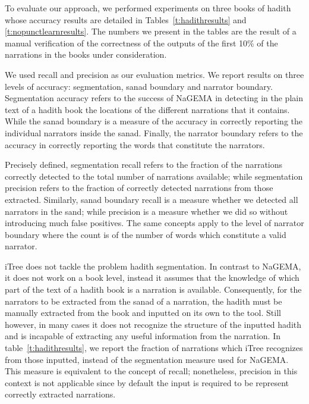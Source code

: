 \documentclass[11pt]{article}
\begin{document}
To evaluate our approach, we performed experiments on three books of 
hadith~\cite{IbnHanbal,AlTousi,AlKulayni} whose accuracy results are detailed in 
Tables~\ref{t:hadithresults} and \ref{t:nopunctlearnresults}. 
The numbers we present in the tables are the result of a manual verification of the correctness of the outputs of the first
10\% of the narrations in the books under consideration.

We used recall and precision as our evaluation metrics.
We report results on three levels of accuracy: segmentation, sanad boundary and
narrator boundary. Segmentation accuracy refers to the success of NaGEMA in
detecting in the plain text of a hadith book the locations of the different
narrations that it contains. While the sanad boundary is a measure of the accuracy
in correctly reporting the individual narrators inside the sanad. Finally, the narrator boundary refers
to the accuracy in correctly reporting the words that constitute the narrators.

Precisely defined, segmentation recall refers to the fraction of the narrations correctly detected to the
total number of narrations available; while segmentation precision refers to the fraction of correctly detected narrations
from those extracted. Similarly, sanad boundary recall is a measure whether we detected all narrators
in the sand; while precision is a measure whether we did so without introducing much false positives. 
The same concepts apply to the level of narrator boundary where the count is of the number of words which constitute a valid narrator.

iTree does not tackle the problem hadith segmentation. In contrast to NaGEMA, it does not work on a book level, 
instead it assumes that the knowledge of which part of the text of a hadith book is a narration is available.
Consequently, for the narrators to be extracted from the sanad of a narration, the hadith must be manually extracted
from the book and inputted on its own to the tool. Still however, in many cases it does not recognize the structure of
the inputted hadith and is incapable of extracting any useful information from the narration. 
In table~\ref{t:hadithresults}, we report the fraction of narrations which iTree recognizes from those inputted, instead
of the segmentation measure used for NaGEMA. This measure is equivalent to the concept of recall; nonetheless, precision
in this context is not applicable since by default the input is required to be represent correctly extracted narrations.
\end{document}
